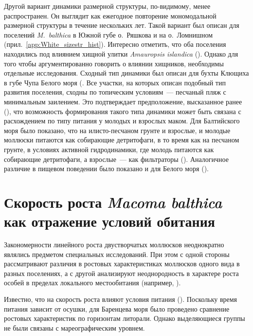 Другой вариант динамики размерной структуры, по-видимому, менее распространен.
Он выглядит как ежегодное повторение мономодальной размерной структуры в течение нескольких лет.
Такой вариант был описан для поселений \textit{M.~balthica} в Южной губе о.~Ряшкова и на о.~Ломнишном (прил.~\ref{app:White_sizestr_hist}).
Интересно отметить, что оба поселения находились под влиянием хищной улитки \textit{Amauropsis islandica} (\cite{Aristov_Granovich_2011}).
Однако для того чтобы аргументированно говорить о влиянии хищников, необходимы отдельные исследования.
Сходный тип динамики был описан для бухты Клющиха в губе Чупа Белого моря (\cite{Maximovich_et_al_1991, Gerasimova_Maximovich_2013}.
Все участки, на которых описан подобный тип развития поселения, сходны по топическим условиям~--- песчаный пляж с минимальным заилением.
Это подтверждает предположение, высказанное ранее (\cite{Gerasimova_Maximovich_2013}), что возможность формирования такого типа динамики может быть связана с расхождением по типу питания у молодых и взрослых маком.
Для Балтийского моря было показано, что на илисто-песчаном грунте и взрослые, и молодые моллюски питаются как собирающие детритофаги, в то время как на песчаном грунте, в условиях активной гидродинамики, где молодь питаются как собирающие детритофаги, а взрослые~--- как фильтраторы (\cite{Olafsson_1989}). 
Аналогичное различие в пищевом поведении было показано и для Белого моря (\cite{Gerasimova_1988}).

\afterpage{\clearpage}

		\section{Скорость роста {\it Macoma balthica} как отражение условий обитания}

Закономерности линейного роста двустворчатых моллюсков неоднократно являлись предметом специальных исследований. При этом  с одной стороны рассматривают различия в ростовых характеристиках моллюсков одного вида в разных поселениях, а с другой анализируют неоднородность в характере роста особей в пределах локального местообитания (например, \cite{Segerstrale_1960, Beukema_et_al_1977, Thompson_Bayne_1974, Jensen_1993, Grant_Thorpe_1991}). 

Известно, что на скорость роста влияют условия питания (\cite{Beukema_Meehan_1985, Thompson_Nichols_1988}).
Поскольку время питания зависит от осушки, для Баренцева моря было проведено сравнение ростовых характеристик по горизонтам литорали. Однако выделяющиеся группы не были связаны с мареографическим уровнем.

